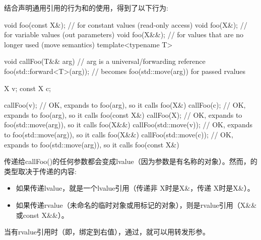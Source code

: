 结合声明通用引用的行为和的使用，得到了以下行为:

\begin{cppcode}
void foo(const X&); // for constant values (read-only access)
void foo(X&); // for variable values (out parameters)
void foo(X&&); // for values that are no longer used (move semantics)
template<typename T>

void callFoo(T&& arg) { // arg is a universal/forwarding reference
	foo(std::forward<T>(arg)); // becomes foo(std::move(arg)) for passed rvalues
}

X v;
const X c;

callFoo(v); // OK, expands to foo(arg), so it calls foo(X&)
callFoo(c); // OK, expands to foo(arg), so it calls foo(const X&)
callFoo(X{}); // OK, expands to foo(std::move(arg)), so it calls foo(X&&)
callFoo(std::move(v)); // OK, expands to foo(std::move(arg)), so it calls foo(X&&)
callFoo(std::move(c)); // OK, expands to foo(std::move(arg)), so it calls foo(const X&)
\end{cppcode}

传递给callFoo()的任何参数都会变成lvalue（因为参数是有名称的对象）。然而，的类型取决于传递的内容:

\begin{itemize}
	\item 如果传递lvalue，就是一个lvalue引用（传递非 X时是X\&，传递 X时是X\&）。
	\item 如果传递rvalue（未命名的临时对象或用标记的对象），则是rvalue引用（X\&\&或const X\&\&）。
\end{itemize}

当有rvalue引用时（即，绑定到右值），通过，就可以用转发形参。




















